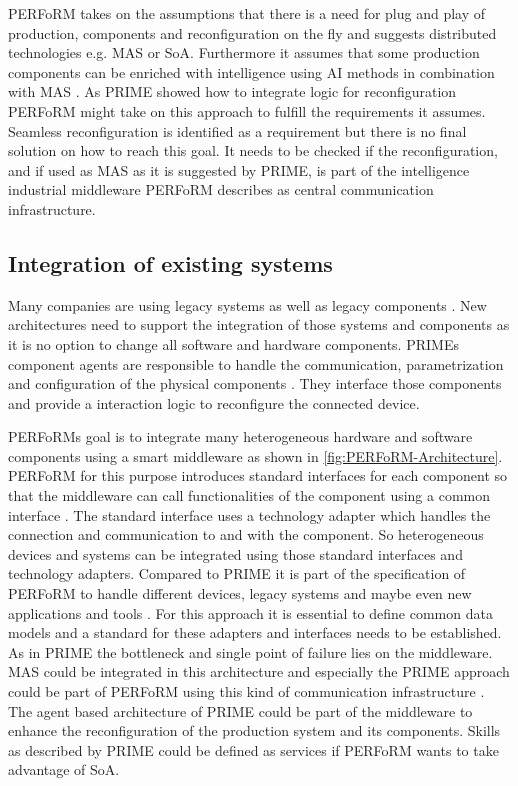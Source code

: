 \documentclass[conference,compsoc,hidelinks]{IEEEtran}
\begin{document}
PERFoRM takes on the assumptions that there is a need for plug and play of production, components and reconfiguration on the fly and suggests distributed technologies e.g. MAS or SoA. Furthermore it assumes that some production components can be enriched with intelligence using AI methods in combination with MAS \cite{SpecPERFoRM}. As PRIME showed how to integrate logic for reconfiguration PERFoRM might take on this approach to fulfill the requirements it assumes. Seamless reconfiguration is identified as a requirement but there is no final solution on how to reach this goal. It needs to be checked if the reconfiguration, and if used as MAS as it is suggested by PRIME, is part of the intelligence industrial middleware PERFoRM describes as central communication infrastructure.

\subsection{Integration of existing systems}
Many companies are using legacy systems as well as legacy components \cite{HarmonizedSystems}. New architectures need to support the integration of those systems and components as it is no option to change all software and hardware components. PRIMEs component agents are responsible to handle the communication, parametrization and configuration of the physical components \cite{Hybrid}. They interface those components and provide a interaction logic to reconfigure the connected device. 

PERFoRMs goal is to integrate many heterogeneous hardware and software components using a smart middleware as shown in \autoref{fig:PERFoRM-Architecture}. PERFoRM for this purpose introduces standard interfaces for each component so that the middleware can call functionalities of the component using a common interface \cite{SpecPERFoRM}. The standard interface uses a technology adapter which handles the connection and communication to and with the component. So heterogeneous devices and systems can be integrated using those standard interfaces and technology adapters. Compared to PRIME it is part of the specification of PERFoRM to handle different devices, legacy systems and maybe even new applications and tools \cite{SpecPERFoRM,HarmonizedSystems}. For this approach it is essential to define common data models and a standard for these adapters and interfaces needs to be established. As in PRIME the bottleneck and single point of failure lies on the middleware. MAS could be integrated in this architecture and especially the PRIME approach could be part of PERFoRM using this kind of communication infrastructure \cite{Peres2017}. The agent based architecture of PRIME could be part of the middleware to enhance the reconfiguration of the production system and its components. Skills as described by PRIME could be defined as services if PERFoRM wants to take advantage of SoA. 
\end{document}
